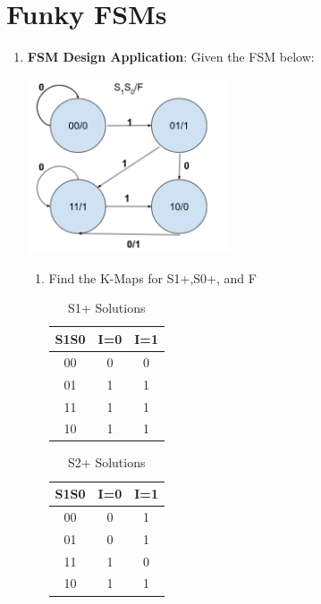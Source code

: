 \documentclass{article}
\begin{document}
\section{Funky FSMs}
    \begin{enumerate}[label=(\alph*)]
        \item \textbf{FSM Design Application}: Given the FSM below:
        \begin{multicols}{2}
            \begin{center}
            \includegraphics[width=6cm]{figures/FSMDesign.png}
            \end{center}
            \columnbreak
        \end{multicols}    
        \begin{enumerate}[label=(\roman*),nolistsep]
            \item Find the K-Maps for S1+,S0+, and F
            \begin{table}[h]
\centering
\begin{tabular}{|c|c|c|}
\hline
S1S0 & I=0 & I=1 \\
\hline
00 & 0 & 0 \\
01 & 1 & 1 \\
11 & 1 & 1 \\
10 & 1 & 1 \\
\hline
\end{tabular}
\caption{S1+ Solutions}
\end{table}

\begin{table}[h]
\centering
\begin{tabular}{|c|c|c|}
\hline
S1S0 & I=0 & I=1 \\
\hline
00 & 0 & 1 \\
01 & 0 & 1 \\
11 & 1 & 0 \\
10 & 1 & 1 \\
\hline
\end{tabular}
\caption{S2+ Solutions}
\end{table}


\end{enumerate}
\end{enumerate}
\end{document}
